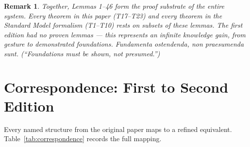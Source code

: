 \documentclass[
  aps,
  prd,
  preprint,
  superscriptaddress,
  nofootinbib,
  floatfix,
  longbibliography
]{revtex4-2}
\newtheorem{remark}{Remark}
\newcommand{\lat}[1]{\textit{#1}}
\begin{document}
\begin{remark}
Together, Lemmas 1--46 form the \emph{proof substrate}
of the entire system.
Every theorem in this paper (T17--T23) and every
theorem in the Standard Model formalism (T1--T10)
rests on subsets of these lemmas.
The first edition had no proven lemmas — this
represents an infinite knowledge gain, from gesture
to demonstrated foundations.
\lat{Fundamenta ostendenda, non praesumenda sunt.}
(``Foundations must be shown, not presumed.'')
\end{remark}

\section{Correspondence: First to Second
         Edition}\label{sec:correspondence}

Every named structure from the original paper maps to a
refined equivalent.
Table~\ref{tab:correspondence} records the full mapping.
\end{document}
